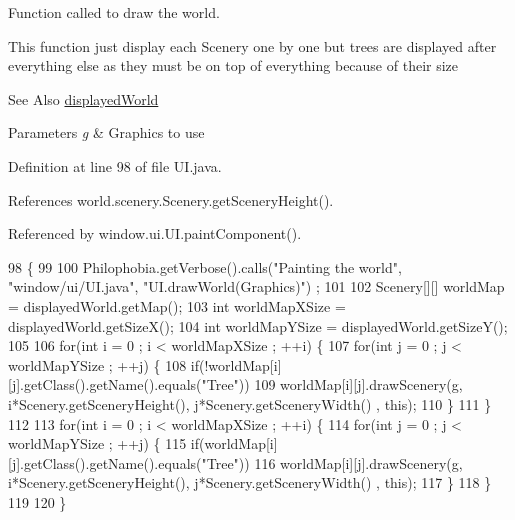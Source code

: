 Function called to draw the world. 

This function just display each Scenery one by one but trees are displayed after everything else as they must be on top of everything because of their size \begin{DoxySeeAlso}{See Also}
\hyperlink{classwindow_1_1ui_1_1_u_i_a964f2be8f2b13b25d66b571325e20757}{displayed\-World} 
\end{DoxySeeAlso}

\begin{DoxyParams}{Parameters}
{\em g} & Graphics to use \\
\hline
\end{DoxyParams}


Definition at line 98 of file U\-I.\-java.



References world.\-scenery.\-Scenery.\-get\-Scenery\-Height().



Referenced by window.\-ui.\-U\-I.\-paint\-Component().


\begin{DoxyCode}
98                                        \{
99     
100         Philophobia.getVerbose().calls(\textcolor{stringliteral}{"Painting the world"}, \textcolor{stringliteral}{"window/ui/UI.java"}, \textcolor{stringliteral}{"UI.drawWorld(Graphics)"})
      ;
101 
102         Scenery[][] worldMap = displayedWorld.getMap();
103         \textcolor{keywordtype}{int} worldMapXSize = displayedWorld.getSizeX();
104         \textcolor{keywordtype}{int} worldMapYSize = displayedWorld.getSizeY();
105 
106         \textcolor{keywordflow}{for}(\textcolor{keywordtype}{int} i = 0 ; i < worldMapXSize ; ++i) \{
107             \textcolor{keywordflow}{for}(\textcolor{keywordtype}{int} j = 0 ; j < worldMapYSize ; ++j) \{
108                 \textcolor{keywordflow}{if}(!worldMap[i][j].getClass().getName().equals(\textcolor{stringliteral}{"Tree"}))
109                     worldMap[i][j].drawScenery(g, i*Scenery.getSceneryHeight(), j*Scenery.getSceneryWidth()
      , \textcolor{keyword}{this});
110             \}
111         \}
112 
113         \textcolor{keywordflow}{for}(\textcolor{keywordtype}{int} i = 0 ; i < worldMapXSize ; ++i) \{
114             \textcolor{keywordflow}{for}(\textcolor{keywordtype}{int} j = 0 ; j < worldMapYSize ; ++j) \{
115                 \textcolor{keywordflow}{if}(worldMap[i][j].getClass().getName().equals(\textcolor{stringliteral}{"Tree"}))
116                     worldMap[i][j].drawScenery(g, i*Scenery.getSceneryHeight(), j*Scenery.getSceneryWidth()
      , \textcolor{keyword}{this});
117             \}
118         \}
119 
120     \}
\end{DoxyCode}


